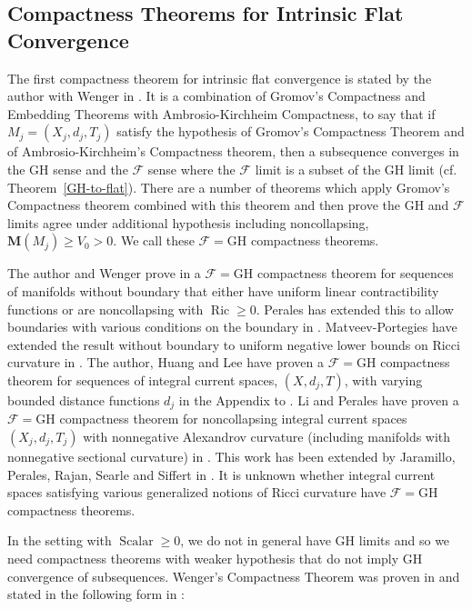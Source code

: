 \documentclass[12pt]{amsart}
\begin{document}
\subsection{Compactness Theorems for Intrinsic Flat Convergence}
\label{subsect-compactness}

The first compactness theorem for intrinsic flat convergence is stated by the
author with Wenger in
\cite{SorWen2}.  It is
a combination of Gromov's Compactness and Embedding Theorems 
with Ambrosio-Kirchheim
Compactness, to say that if $M_j=(X_j, d_j, T_j)$ satisfy the hypothesis
of Gromov's Compactness Theorem and of Ambrosio-Kirchheim's Compactness
theorem, then a subsequence converges in the GH sense and the $\mathcal{F}$ sense
where the $\mathcal{F}$ limit is a subset of the GH limit 
(cf. Theorem~\ref{GH-to-flat}).  There are
a number of theorems which apply Gromov's Compactness
theorem combined with this theorem and then prove
the GH and $\mathcal{F}$ limits agree under additional hypothesis
including noncollapsing, ${{\mathbf M}}(M_j) \ge V_0>0$.  
We call these $\mathcal{F}=$GH compactness theorems.   

The author and Wenger prove in
\cite{SorWen2} a $\mathcal{F}=$GH compactness theorem
for sequences of manifolds without boundary that either
have uniform linear contractibility functions or 
are noncollapsing with ${\operatorname{Ric}} \ge 0$.  Perales has extended this to allow 
boundaries with
various conditions on the boundary in \cite{Perales-Conv}.   Matveev-Portegies
have extended the result without boundary to uniform negative lower
bounds on Ricci curvature in \cite{Matveev-Portegies}.   The author,
Huang and Lee have proven a $\mathcal{F}=$GH compactness
theorem for sequences of integral current spaces, $(X, d_j, T)$, with 
varying bounded distance functions $d_j$ in the Appendix to \cite{HLS}.
Li and Perales have proven a $\mathcal{F}=$GH compactness theorem for 
noncollapsing integral current
spaces $(X_j, d_j, T_j)$ with nonnegative Alexandrov
curvature (including manifolds with nonnegative sectional curvature)
in \cite{Li-Perales}.   This work has been extended by Jaramillo, Perales,
Rajan,
Searle and Siffert in \cite{BANFF}.  It is unknown whether integral current
spaces satisfying various generalized notions of Ricci curvature
have $\mathcal{F}=$GH compactness theorems.

In the setting with ${\operatorname{Scalar}} \ge 0$, we do not in general have GH limits and
so we need compactness theorems with weaker hypothesis that do not
imply GH convergence of subsequences. 
Wenger's Compactness Theorem was proven in \cite{Wenger-compactness}
and stated in the following form in \cite{SorWen2}:
\end{document}
